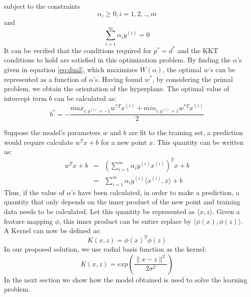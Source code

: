 \documentclass[%
        final,
        notitlepage,
        narroweqnarray,
        inline,
        ]{ieee}
\begin{document}
subject to the constraints
\begin{equation}
\alpha_{i} \geq 0, i = 1,2,..,m
\end{equation}
and
\begin{equation}
\sum_{i=1}^{m} \alpha_{i}y^{(i)} = 0
\end{equation}
It can be verified that the conditions required for $p^*=d^*$ and the KKT conditions to hold are satisfied in this optimization problem.
By finding the $\alpha$'s given in equation \ref{eq:dual}, which maximizes $W(\alpha)$, the optimal $w$'s can be represented as a function of $\alpha$'s.
Having found $w^{*}$, by considering the primal problem, we obtain the orientation of the hyperplane.
The optimal value of intercept term $b$ can be calculated as:
\begin{equation}
b^{*} = - \frac {max_{i:y^{(i)}=-1}w^{*T}x^{(i)} + min_{i:y^{(i)}=1}w^{*T}x^{(i)}} {2}
\end{equation}

Suppose the model's parameters $w$ and $b$ are fit to the training set, a prediction would require calculate $w^Tx+b$ for a new point $x$. 
This quantity can be written as:
\begin{eqnarray}
w^Tx + b & = & \left( \sum_{i=1}^{m}\alpha_{i} y^{(i)} x^{(i)} \right)^Tx + b \\
         & = & \sum_{i=1}^{m} \alpha_{i}y^{(i)}\langle x^{(i)},x\rangle + b
\end{eqnarray}
Thus, if the value of $\alpha$'s have been calculated, in order to make a prediction, a quantity that only depends on the inner product of the new point and training data needs to be calculated.
Let this quantity be represented as $\langle x, z\rangle$.
Given a feature mapping $\phi$, this inner product can be entire replace by $\langle \phi(x),\phi(z) \rangle$.
A Kernel can now be defined as:
\begin{equation}
K(x,z) = \phi(x)^T\phi(z)
\end{equation}
In our proposed solution, we use radial basis function as the kernel:
\begin{equation}
K(x,z) = exp\left( \frac {\parallel x - z \parallel ^2} {2\sigma^2} \right)
\end{equation}
In the next section we show how the model obtained is used to solve the learning problem.


\end{document}
